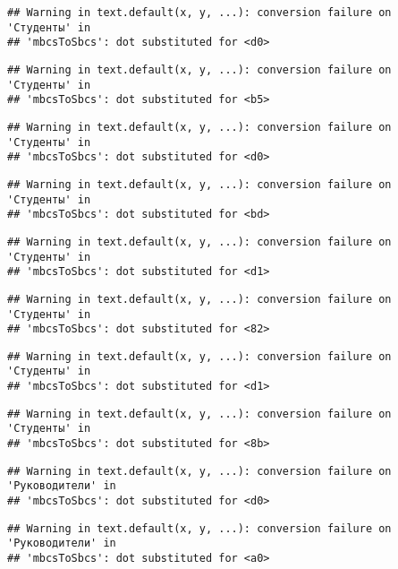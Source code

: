 \documentclass[
]{article}
\begin{document}
\begin{verbatim}
## Warning in text.default(x, y, ...): conversion failure on 'Студенты' in
## 'mbcsToSbcs': dot substituted for <d0>
\end{verbatim}

\begin{verbatim}
## Warning in text.default(x, y, ...): conversion failure on 'Студенты' in
## 'mbcsToSbcs': dot substituted for <b5>
\end{verbatim}

\begin{verbatim}
## Warning in text.default(x, y, ...): conversion failure on 'Студенты' in
## 'mbcsToSbcs': dot substituted for <d0>
\end{verbatim}

\begin{verbatim}
## Warning in text.default(x, y, ...): conversion failure on 'Студенты' in
## 'mbcsToSbcs': dot substituted for <bd>
\end{verbatim}

\begin{verbatim}
## Warning in text.default(x, y, ...): conversion failure on 'Студенты' in
## 'mbcsToSbcs': dot substituted for <d1>
\end{verbatim}

\begin{verbatim}
## Warning in text.default(x, y, ...): conversion failure on 'Студенты' in
## 'mbcsToSbcs': dot substituted for <82>
\end{verbatim}

\begin{verbatim}
## Warning in text.default(x, y, ...): conversion failure on 'Студенты' in
## 'mbcsToSbcs': dot substituted for <d1>
\end{verbatim}

\begin{verbatim}
## Warning in text.default(x, y, ...): conversion failure on 'Студенты' in
## 'mbcsToSbcs': dot substituted for <8b>
\end{verbatim}

\begin{verbatim}
## Warning in text.default(x, y, ...): conversion failure on 'Руководители' in
## 'mbcsToSbcs': dot substituted for <d0>
\end{verbatim}

\begin{verbatim}
## Warning in text.default(x, y, ...): conversion failure on 'Руководители' in
## 'mbcsToSbcs': dot substituted for <a0>
\end{verbatim}
\end{document}
